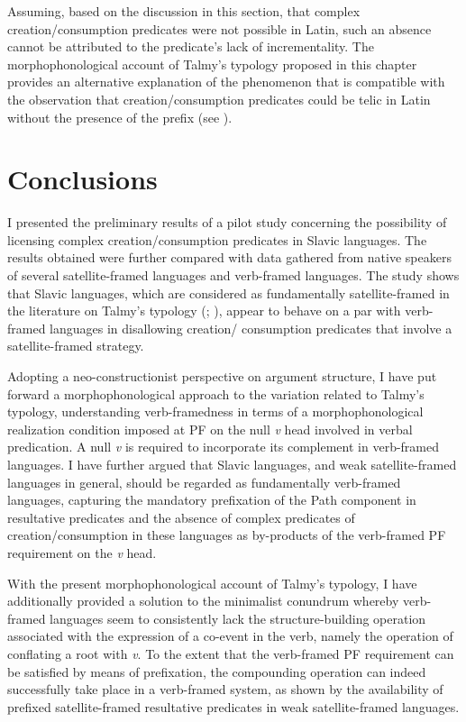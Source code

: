 \documentclass[output=paper,colorlinks,citecolor=brown]{langscibook}
\begin{document}
\noindent Assuming, based on the discussion in this section, that complex creation/con\-sum\-ption predicates were not possible in Latin, such an absence %
cannot be attributed to the predicate's lack of incrementality. The morphophonological account of Talmy's typology proposed in this chapter provides an alternative explanation of the phenomenon that is compatible with the observation that creation/con\-sump\-tion predicates could be telic in Latin without the presence of the prefix (see ). %


\section{Conclusions}\label{6}

I presented the preliminary results of a pilot study concerning the possibility of licensing complex creation/consumption predicates in Slavic languages. The results obtained were further compared with data gathered from native speak\-ers of several satellite-framed languages and verb-framed languages. The study shows that Slavic languages, which are considered as fundamentally satellite-framed in the literature on Talmy's typology (\citealt{Talmy2000}; \citealt{Acedo-Matellan2016}), appear to behave on a par with verb-framed languages in disallowing creation/ consumption predicates that involve a satellite-framed strategy.

Adopting a neo-constructionist perspective on argument structure, I have put forward a morphophonological approach to the variation related to Talmy's typology, understanding verb-framedness in terms of a morphophonological realization condition imposed at PF on the null \textit{v} head involved in verbal predication. A null \textit{v} is required to incorporate its complement in verb-framed languages. I have further argued that Slavic languages, and weak satellite-framed languages in general, should be regarded as fundamentally verb-framed languages, capturing the mandatory prefixation of the Path component in resultative predicates and the absence of complex predicates of creation/consumption in these languages as by-products of the verb-framed PF requirement on the \textit{v} head.

With the present morphophonological account of Talmy's typology, I have additionally provided a solution to the minimalist conundrum whereby verb-framed languages seem to consistently lack the structure-building operation associated with the expression of a co-event in the verb, namely the operation of conflating a root with \textit{v}. To the extent that the verb-framed PF requirement can be satisfied by means of prefixation, the compounding operation can indeed successfully take place in a verb-framed system, as shown by the availability of prefixed satellite-framed resultative predicates in weak satellite-framed languages.
\end{document}
